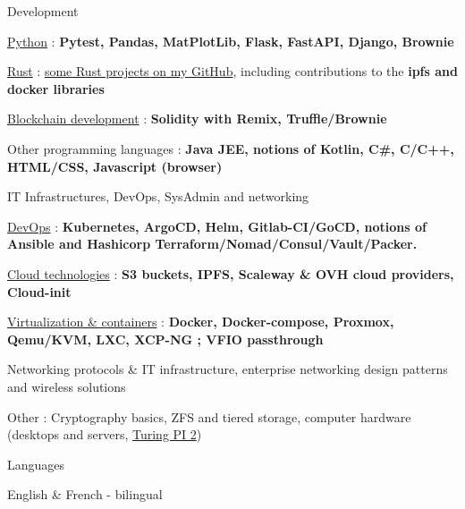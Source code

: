 \begin{cventries}
  \cventry
    {} %
    {Development} %
    {} %
    {} %
    {
      \begin{cvitems} %
        \item {\underline{Python} : \textbf{Pytest, Pandas, MatPlotLib, Flask, FastAPI, Django, Brownie}}
        \item {\underline{Rust} : \href{https://github.com/guillheu?tab=repositories&q=&type=&language=rust&sort=}{some Rust projects on my GitHub}, including contributions to the \textbf{ipfs and docker libraries}}
        \item {\underline{Blockchain development} : \textbf{Solidity with Remix, Truffle/Brownie}}
        \item {Other programming languages : \textbf{Java JEE, notions of Kotlin, C\#, C/C++, HTML/CSS, Javascript (browser)}}
      \end{cvitems}
    }
  \cventry
    {} %
    {IT Infrastructures, DevOps, SysAdmin and networking} %
    {} %
    {} %
    {
      \begin{cvitems} %
        \item {\underline{DevOps} : \textbf{Kubernetes, ArgoCD, Helm, Gitlab-CI/GoCD, notions of Ansible and Hashicorp Terraform/Nomad/Consul/Vault/Packer.}}
        \item {\underline{Cloud technologies} : \textbf{S3 buckets, IPFS, Scaleway \& OVH cloud providers, Cloud-init}}
        \item {\underline{Virtualization \& containers} : \textbf{Docker, Docker-compose, Proxmox, Qemu/KVM, LXC, XCP-NG ; VFIO passthrough}}
        \item {Networking protocols \& IT infrastructure, enterprise networking design patterns and wireless solutions}
        \item {Other : Cryptography basics, ZFS and tiered storage, computer hardware (desktops and servers, \href{https://turingpi.com/}{Turing PI 2})\\}
      \end{cvitems}
    }
  \cventry
    {} %
    {Languages} %
    {} %
    {} %
    {
      \begin{cvitems} %
        \item {English \& French - bilingual}
      \end{cvitems}
    }
\end{cventries}